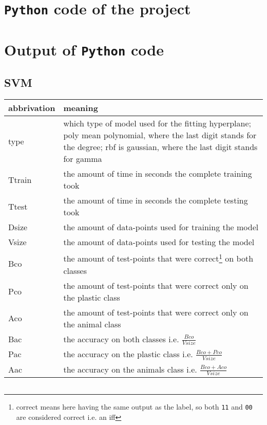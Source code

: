 \vfill



\clearpage

\begin{appendix}
\renewcommand{\thesubsection}{\thesection.\roman{subsection}}
\renewcommand{\thesubsubsection}{\thesubsection - \arabic{subsubsection}}

\section{\texttt{Python} code of the project}
\label{sec:ap-code}

\section{Output of \texttt{Python} code}
\label{sec:ap-out}

\subsection{SVM}
\ifx\showapp\undefined
\begin{tabular}{ p{ } | p{ } }
abbrivation & meaning \\ \hline
type & which type of model used for the fitting hyperplane; poly mean polynomial, where the last digit stands for the degree; rbf is gaussian, where the last digit stands for gamma \\
Ttrain & the amount of time in seconds the complete training took \\
Ttest & the amount of time in seconds the complete testing took \\
Dsize & the amount of data-points used for training the model \\
Vsize & the amount of data-points used for testing the model \\
Bco & the amount of test-points that were correct\footnote{correct means here having the same output as the label, so both \texttt{11} and \texttt{00} are considered correct i.e. an iff} on both classes \\
Pco & the amount of test-points that were correct only on the plastic class \\
Aco & the amount of test-points that were correct only on the animal class \\
Bac & the accuracy on both classes i.e. $\frac{Bco}{Vsize}$ \\
Pac & the accuracy on the plastic class i.e. $\frac{Bco+Pco}{Vsize}$ \\
Aac & the accuracy on the animals class i.e. $\frac{Bco+Aco}{Vsize}$
\end{tabular}
{\small
\begin{longtable}{r|r|r|r|r|r|r|r|r|r|r|r}

\end{longtable}
}
\fi
\end{appendix}
